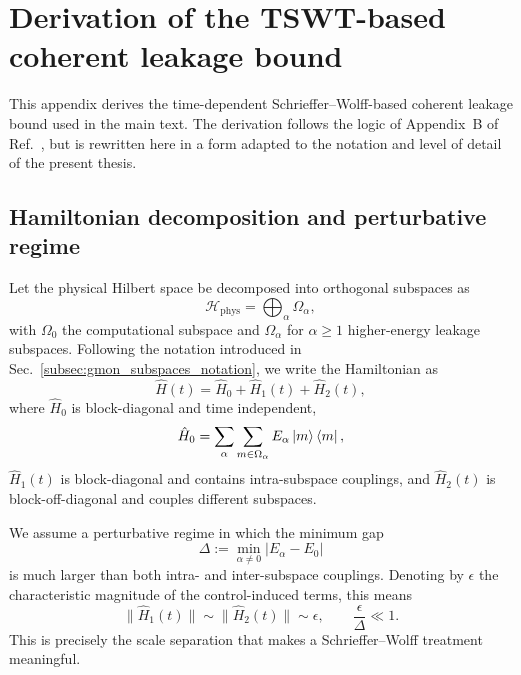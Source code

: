 \chapter{Derivation of the TSWT-based coherent leakage bound}
\label{app:tswt_coherent_leakage_bound}

This appendix derives the time-dependent Schrieffer--Wolff-based coherent leakage bound used in the main text. The derivation follows the logic of Appendix~B of Ref.~\cite{Niu2019}, but is rewritten here in a form adapted to the notation and level of detail of the present thesis.

\section{Hamiltonian decomposition and perturbative regime}
\label{app:tswt_setup}

Let the physical Hilbert space be decomposed into orthogonal subspaces as
\begin{equation}
\mathcal{H}_{\mathrm{phys}}
=
\bigoplus_{\alpha}\Omega_{\alpha},
\label{eq:app_tswt_hilbert_decomposition}
\end{equation}
with \(\Omega_0\) the computational subspace and \(\Omega_{\alpha}\) for \(\alpha\ge 1\) higher-energy leakage subspaces. Following the notation introduced in Sec.~\ref{subsec:gmon_subspaces_notation}, we write the Hamiltonian as
\begin{equation}
\hat{H}(t)
=
\hat{H}_0
+
\hat{H}_1(t)
+
\hat{H}_2(t),
\label{eq:app_tswt_hamiltonian_split}
\end{equation}
where \(\hat{H}_0\) is block-diagonal and time independent,
\begin{equation}
\hat{H}_0
=
\sum_{\alpha}\sum_{m\in\Omega_\alpha}
E_\alpha \ket{m}\bra{m},
\label{eq:app_tswt_H0}
\end{equation}
\(\hat{H}_1(t)\) is block-diagonal and contains intra-subspace couplings, and \(\hat{H}_2(t)\) is block-off-diagonal and couples different subspaces.

We assume a perturbative regime in which the minimum gap
\begin{equation}
\Delta
:=
\min_{\alpha\neq 0}|E_\alpha-E_0|
\label{eq:app_tswt_gap}
\end{equation}
is much larger than both intra- and inter-subspace couplings. Denoting by \(\epsilon\) the characteristic magnitude of the control-induced terms, this means
\begin{equation}
\|\hat{H}_1(t)\|
\sim
\|\hat{H}_2(t)\|
\sim
\epsilon,
\qquad
\frac{\epsilon}{\Delta}\ll 1.
\label{eq:app_tswt_small_parameter}
\end{equation}
This is precisely the scale separation that makes a Schrieffer--Wolff treatment meaningful.

